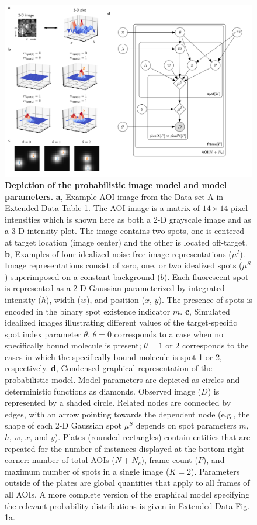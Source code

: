 \begin{figure}
\includegraphics[width=\textwidth]{figures/figure2.png}
\caption{\textbf{Depiction of the probabilistic image model and model parameters.} \textbf{a}, Example AOI image from the Data set A in Extended Data Table 1. The AOI image is a matrix of $14 \times 14$ pixel intensities which is shown here as both a 2-D grayscale image and as a 3-D intensity plot. The image contains two spots, one is centered at target location (image center) and the other is located off-target. \textbf{b}, Examples of four idealized noise-free image representations ($\mu^I$). Image representations consist of zero, one, or two idealized spots ($\mu^S$) superimposed on a constant background ($b$). Each fluorescent spot is represented as a 2-D Gaussian parameterized by integrated intensity ($h$), width ($w$), and position ($x$, $y$). The presence of spots is encoded in the binary spot existence indicator $m$. \textbf{c}, Simulated idealized images illustrating different values of the target-specific spot index parameter $\theta$. $\theta = 0$ corresponds to a case when no specifically bound molecule is present; $\theta = 1$ or 2 corresponds to the cases in which the specifically bound molecule is spot 1 or 2, respectively. \textbf{d}, Condensed graphical representation of the probabilistic model. Model parameters are depicted as circles and deterministic functions as diamonds. Observed image ($D$) is represented by a shaded circle. Related nodes are connected by edges, with an arrow pointing towards the dependent node (e.g., the shape of each 2-D Gaussian spot $\mu^S$ depends on spot parameters $m$, $h$, $w$, $x$, and $y$). Plates (rounded rectangles) contain entities that are repeated for the number of instances displayed at the bottom-right corner: number of total AOIs ($N+N_\mathsf{c}$), frame count ($F$), and maximum number of spots in a single image ($K=2$). Parameters outside of the plates are global quantities that apply to all frames of all AOIs. A more complete version of the graphical model specifying the relevant probability distributions is given in Extended Data Fig. 1a. }

\end{figure}
